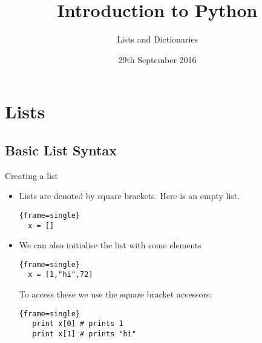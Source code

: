 \documentclass{beamer}
\title{Introduction to Python}
\subtitle{Lists and Dictionaries}
\date{29th September 2016}
\begin{document}
\lstset{language=Python}

\begin{frame}
  \titlepage
\end{frame}

\section{Lists}

\subsection{Basic List Syntax}
\begin{frame}[fragile]{Creating a list}
  \begin{itemize}
  \item {
  Lists are denoted by square brackets. Here is an empty list.
  \begin{block}{}
  \begin{lstlisting}{frame=single}
  x = []
  \end{lstlisting}
\end{block}
 } 
 \pause
 \item {
We can also initialise the list with some elements	  
 \begin{block}{}
 \begin{lstlisting}{frame=single}
  x = [1,"hi",72]
  \end{lstlisting}
\end{block}
\pause

  To access these we use the square bracket accessors:
  \begin{block}{}
  \begin{lstlisting}{frame=single}
   print x[0] # prints 1
   print x[1] # prints "hi"
  \end{lstlisting}
\end{block}
  }
  \end{itemize}
  

\end{frame}
\end{document}
